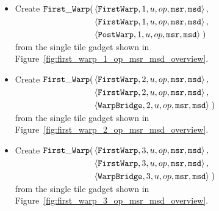 \begin{itemize}
\begin{itemize}
            \item Create
            $\begin{aligned}[t]
                \firstwarp(& \left\langle {\tt FirstWarp}, 1, u, \inc, {\tt msr}, {\tt msd} \right\rangle, \\ %
                           & \left\langle {\tt FirstWarp}, 1, u, \inc, {\tt msr}, {\tt msd} \right\rangle, \\ %
                           & \left\langle {\tt PostWarp},  1, u, \inc, {\tt msr}, {\tt msd} \right\rangle \;) %
            \end{aligned}$\\ from the single tile gadget shown in Figure~\ref{fig:first_warp_1_op_msr_msd_overview}.
            \vspace{.5cm}

            \item Create
            $\begin{aligned}[t]
                \firstwarp(& \left\langle {\tt FirstWarp},  2, u, \inc, {\tt msr}, {\tt msd} \right\rangle, \\ %
                           & \left\langle {\tt FirstWarp},  2, u, \inc, {\tt msr}, {\tt msd} \right\rangle, \\ %
                           & \left\langle {\tt WarpBridge}, 2, u, \inc, {\tt msr}, {\tt msd} \right\rangle \;) %
            \end{aligned}$\\ from the single tile gadget shown in Figure~\ref{fig:first_warp_2_op_msr_msd_overview}.
            \vspace{.5cm}

            \item Create
            $\begin{aligned}[t]
                \firstwarp(& \left\langle {\tt FirstWarp},  3, u, \inc, {\tt msr}, {\tt msd} \right\rangle,\\  %
                           & \left\langle {\tt FirstWarp},  3, u, \inc, {\tt msr}, {\tt msd} \right\rangle,\\  %
                           & \left\langle {\tt WarpBridge}, 3, u, \inc, {\tt msr}, {\tt msd} \right\rangle \;) %
            \end{aligned}$\\ from the single tile gadget shown in Figure~\ref{fig:first_warp_3_op_msr_msd_overview}.
            \vspace{.5cm}


\end{itemize}
\end{itemize}
